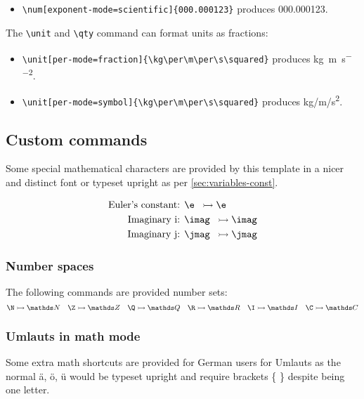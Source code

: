         \begin{itemize}
            \item \verb|\num[exponent-mode=scientific]{000.000123}| produces \num[exponent-mode=scientific]{000.000123}.
        \end{itemize}

        The \verb|\unit| and \verb|\qty| command can format units as fractions:
        \begin{itemize}
            \item \verb|\unit[per-mode=fraction]{\kg\per\m\per\s\squared}|
               produces \unit[per-mode=fraction]{\kg\per\m\per\s\squared}.
            \item \verb|\unit[per-mode=symbol]{\kg\per\m\per\s\squared}|
               produces \unit[per-mode=symbol]{\kg\per\m\per\s\squared}.
        \end{itemize}

\subsection{Custom commands}
    Some special mathematical characters are provided by this template in a nicer and distinct font or typeset upright as per \cref{sec:variables-const}.

    \begin{align*}
        \text{Euler's constant: } & \texttt{\tb e    } \rightarrowtail  \e    \\
        \text{Imaginary i: }      & \texttt{\tb imag } \rightarrowtail  \imag \\
        \text{Imaginary j: }      & \texttt{\tb jmag } \rightarrowtail  \jmag
    \end{align*}

    \subsubsection{Number spaces}
        The following commands are provided number sets:
        \[
            \verb|\N| \rightarrowtail \N \quad
            \verb|\Z| \rightarrowtail \Z \quad
            \verb|\Q| \rightarrowtail \Q \quad
            \verb|\R| \rightarrowtail \R \quad
            \verb|\I| \rightarrowtail \I \quad
            \verb|\C| \rightarrowtail \C
        \]

    \subsubsection{Umlauts in math mode}
        Some extra math shortcuts are provided for German users for Umlauts as the normal ä, ö, ü would be typeset upright and require brackets \{ \} despite being one letter.

